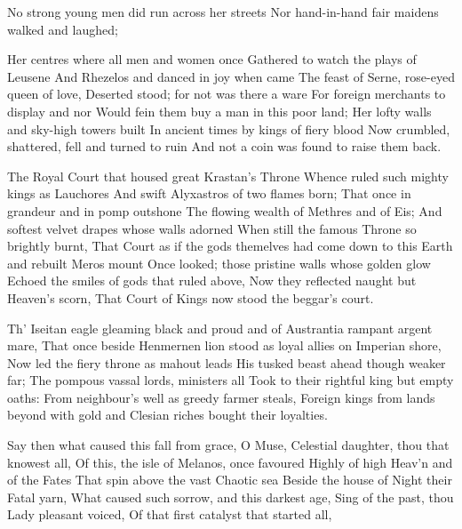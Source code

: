 \documentclass[a4paper,12pt]{article}
\newcommand{\vel}{\verseline}
\begin{document}
\begin{poem}
\begin{stanza}
No strong young men did run across her streets\vel
Nor hand-in-hand fair maidens walked and laughed;
\end{stanza}
\begin{stanza}
Her centres where all men and women once\vel
Gathered to watch the plays of Leusene\vel
And Rhezelos and danced in joy when came\vel
The feast of Serne, rose-eyed queen of love,\vel
Deserted stood; for not was there a ware\vel
For foreign merchants to display and nor\vel
Would fein them buy a man in this poor land;\vel
Her lofty walls and sky-high towers built\vel
In ancient times by kings of fiery blood\vel
Now crumbled, shattered, fell and turned to ruin\vel
And not a coin was found to raise them back.
\end{stanza}
\begin{stanza}
The Royal Court that housed great Krastan's Throne\vel
Whence ruled such mighty kings as Lauchores\vel
And swift Alyxastros of two flames born;\vel
That once in grandeur and in pomp outshone\vel
The flowing wealth of Methres and of Eis;\vel
And softest velvet drapes whose walls adorned\vel
When still the famous Throne so brightly burnt,\vel
That Court as if the gods themelves had come\vel
down to this Earth and rebuilt Meros mount \vel
Once looked; those pristine walls whose golden glow\vel
Echoed the smiles of gods that ruled above,\vel
Now they reflected naught but Heaven's scorn,\vel
That Court of Kings now stood the beggar's court.
\end{stanza}
\begin{stanza}
Th' Iseitan eagle gleaming black and proud\vel
and of Austrantia rampant argent mare,\vel
That once beside Henmernen lion stood\vel
as loyal allies on Imperian shore,\vel
Now led the fiery throne as mahout leads\vel
His tusked beast ahead though weaker far;\vel
The pompous vassal lords, ministers all\vel
Took to their rightful king but empty oaths:\vel
From neighbour's well as greedy farmer steals,\vel
Foreign kings from lands beyond with gold\vel
and Clesian riches bought their loyalties.
\end{stanza}
\begin{stanza}
Say then what caused this fall from grace, O Muse,\vel
Celestial daughter, thou that knowest all,\vel
Of this, the isle of Melanos, once favoured\vel
Highly of high Heav'n and of the Fates\vel
That spin above the vast Chaotic sea\vel
Beside the house of Night their Fatal yarn,\vel
What caused such sorrow, and this darkest age,\vel
Sing of the past, thou Lady pleasant voiced,\vel
Of that first catalyst that started all,\vel

\end{stanza}
\end{poem}
\end{document}
